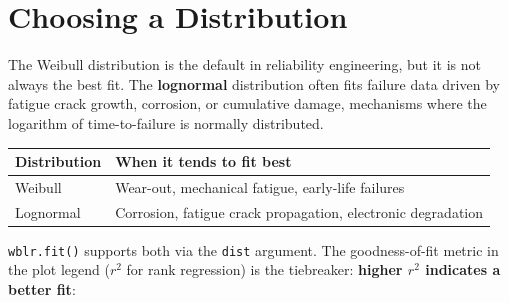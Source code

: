 \documentclass[
  letterpaper,
  DIV=11,
  numbers=noendperiod]{scrreprt}
\newcounter{none} %
\begin{document}
\section{Choosing a Distribution}\label{choosing-a-distribution}

The Weibull distribution is the default in reliability engineering, but
it is not always the best fit. The \textbf{lognormal} distribution often
fits failure data driven by fatigue crack growth, corrosion, or
cumulative damage, mechanisms where the logarithm of time-to-failure is
normally distributed.

{\def\LTcaptype{none} %
\begin{longtable}[]{@{}
  >{\raggedright\arraybackslash}p{}
  >{\raggedright\arraybackslash}p{}@{}}
\toprule\noalign{}
\begin{minipage}[b]{\linewidth}\raggedright
Distribution
\end{minipage} & \begin{minipage}[b]{\linewidth}\raggedright
When it tends to fit best
\end{minipage} \\
\midrule\noalign{}
\endhead
\bottomrule\noalign{}
\endlastfoot
Weibull & Wear-out, mechanical fatigue, early-life failures \\
Lognormal & Corrosion, fatigue crack propagation, electronic
degradation \\
\end{longtable}
}

\texttt{wblr.fit()} supports both via the \texttt{dist} argument. The
goodness-of-fit metric in the plot legend (\(r^2\) for rank regression)
is the tiebreaker: \textbf{higher \(r^2\) indicates a better fit}:
\end{document}
